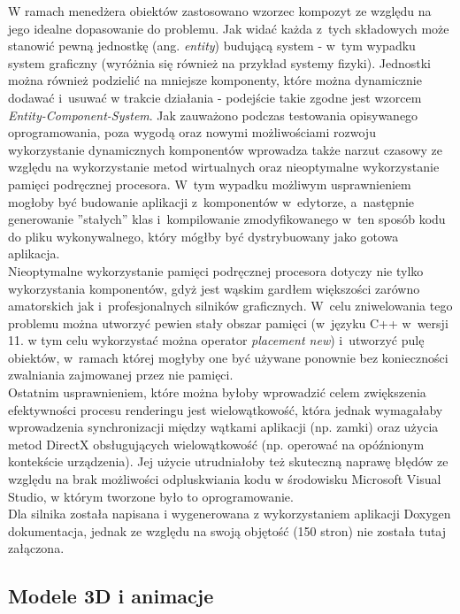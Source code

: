 W ramach menedżera obiektów zastosowano wzorzec kompozyt ze względu na jego idealne dopasowanie do problemu.
Jak widać każda z~tych składowych może stanowić pewną jednostkę (ang. \emph{entity}) budującą system - w~tym wypadku system graficzny (wyróżnia się również na przykład systemy fizyki). Jednostki można również podzielić na mniejsze komponenty, które można dynamicznie dodawać i~usuwać w trakcie działania - podejście takie zgodne jest wzorcem \emph{Entity-Component-System}. Jak zauważono podczas testowania opisywanego oprogramowania, poza wygodą oraz nowymi możliwościami rozwoju wykorzystanie dynamicznych komponentów wprowadza także narzut czasowy ze względu na wykorzystanie metod wirtualnych oraz nieoptymalne wykorzystanie pamięci podręcznej procesora. W~tym wypadku możliwym usprawnieniem mogłoby być budowanie aplikacji z~komponentów w~edytorze, a~następnie generowanie ''stałych'' klas i~kompilowanie zmodyfikowanego w~ten sposób kodu do pliku wykonywalnego, który mógłby być dystrybuowany jako gotowa aplikacja.\\
Nieoptymalne wykorzystanie pamięci podręcznej procesora dotyczy nie tylko wykorzystania komponentów, gdyż jest wąskim gardłem większości zarówno amatorskich jak i~profesjonalnych silników graficznych. W~celu zniwelowania tego problemu można utworzyć pewien stały obszar pamięci (w~języku C++ w~wersji 11. w tym celu wykorzystać można operator \emph{placement new}) i~utworzyć pulę obiektów, w~ramach której mogłyby one być używane ponownie bez konieczności zwalniania zajmowanej przez nie pamięci.\\
Ostatnim usprawnieniem, które można byłoby wprowadzić celem zwiększenia efektywności procesu renderingu jest wielowątkowość, która jednak wymagałaby wprowadzenia synchronizacji między wątkami aplikacji (np. zamki) oraz użycia metod DirectX obsługujących wielowątkowość (np. operować na opóźnionym kontekście urządzenia). Jej użycie utrudniałoby też skuteczną naprawę błędów ze względu na brak możliwości odpluskwiania kodu w środowisku Microsoft Visual Studio, w którym tworzone było to oprogramowanie.\\
Dla silnika została napisana i wygenerowana z wykorzystaniem aplikacji Doxygen dokumentacja, jednak ze względu na swoją objętość (150 stron) nie została tutaj załączona.

\subsection{Modele 3D i animacje}

